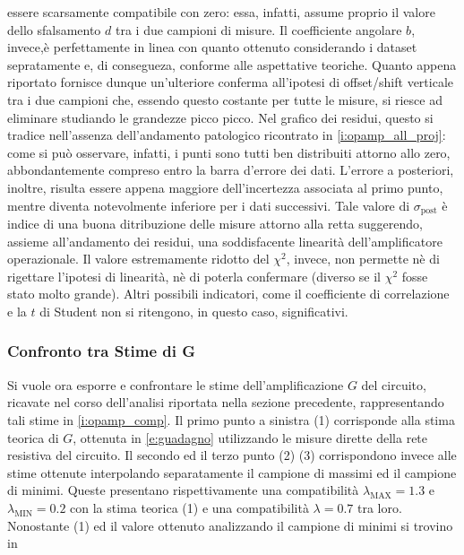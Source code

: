 \documentclass[a4paper,11pt]{article} %
\begin{document}
essere scarsamente compatibile con zero: essa, infatti, assume proprio il valore dello sfalsamento $d$ tra i due
campioni di misure. Il coefficiente angolare $b$, invece,è perfettamente in linea con quanto ottenuto considerando i
dataset sepratamente e, di consegueza, conforme alle aspettative teoriche. Quanto appena riportato fornisce dunque
un'ulteriore conferma all'ipotesi di offset/shift verticale tra i due campioni che, essendo questo costante per tutte le
misure, si riesce ad eliminare studiando le grandezze picco picco. Nel grafico dei residui, questo si tradice
nell'assenza dell'andamento patologico ricontrato in \autoref{i:opamp_all_proj}: come si può osservare, infatti, i punti
sono tutti ben distribuiti attorno allo zero, abbondantemente compreso entro la barra d'errore dei dati. L'errore a
posteriori, inoltre, risulta essere appena maggiore dell'incertezza associata al primo punto, mentre diventa
notevolmente inferiore per i dati successivi. Tale valore di $\sigma_{\text{post}}$ è indice di una buona ditribuzione
delle misure attorno alla retta suggerendo, assieme all'andamento dei residui, una soddisfacente linearità
dell'amplificatore operazionale. Il valore estremamente ridotto del $\chi^2$, invece, non permette nè di rigettare
l'ipotesi di linearità, nè di poterla confermare (diverso se il $\chi^2$ fosse stato molto grande). Altri
possibili indicatori, come il coefficiente di correlazione e la $t$ di Student non si ritengono, in questo caso,
significativi.



\subsubsection{Confronto tra Stime di G}

Si vuole ora esporre e confrontare le stime dell'amplificazione $G$ del circuito, ricavate nel corso dell'analisi
riportata nella sezione precedente, rappresentando tali stime in \autoref{i:opamp_comp}. Il primo punto a sinistra (1)
corrisponde alla stima teorica di $G$, ottenuta in \autoref{e:guadagno} utilizzando le misure dirette della rete
resistiva del circuito. Il secondo ed il terzo punto (2) (3) corrispondono invece alle stime ottenute interpolando
separatamente il campione di massimi ed il campione di minimi. Queste presentano rispettivamente una compatibilità
$\lambda_{\text{MAX}}=1.3$ e $\lambda_{\text{MIN}}=0.2$ con la stima teorica (1) e una compatibilità $\lambda=0.7$ tra
loro. Nonostante (1) ed il valore ottenuto analizzando il campione di minimi si trovino in
\end{document}
